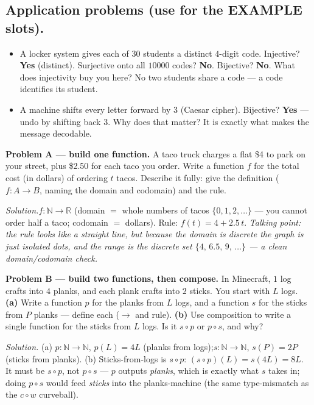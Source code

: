 \documentclass[12pt]{article}
\begin{document}
\subsection*{Application problems (use for the EXAMPLE slots).}
\begin{itemize}
  \item A locker system gives each of $30$ students a distinct $4$-digit code. Injective? \textbf{Yes} (distinct). Surjective onto all $10000$ codes? \textbf{No}. Bijective? \textbf{No}. What does injectivity buy you here? No two students share a code --- a code identifies its student.
  \item A machine shifts every letter forward by $3$ (Caesar cipher). Bijective? \textbf{Yes} --- undo by shifting back $3$. Why does that matter? It is exactly what makes the message decodable.
\end{itemize}

\textbf{Problem A --- build one function.}\quad
A taco truck charges a flat \$4 to park on your street, plus \$2.50 for each taco you order. Write a function $f$ for the total cost (in dollars) of ordering $t$ tacos. Describe it fully: give the definition ($f\colon A \to B$, naming the domain and codomain) and the rule.

\textit{Solution.}\quad $f\colon \mathbb{N} \to \mathbb{R}$ (domain $=$ whole numbers of tacos $\{0,1,2,\ldots\}$ --- you cannot order half a taco; codomain $=$ dollars). Rule: $f(t) = 4 + 2.5\,t$. \textit{Talking point: the rule looks like a straight line, but because the domain is discrete the graph is just isolated dots, and the range is the discrete set $\{4,\,6.5,\,9,\,\ldots\}$ --- a clean domain/codomain check.}

\medskip
\textbf{Problem B --- build two functions, then compose.}\quad
In Minecraft, $1$ log crafts into $4$ planks, and each plank crafts into $2$ sticks. You start with $L$ logs.
\textbf{(a)} Write a function $p$ for the planks from $L$ logs, and a function $s$ for the sticks from $P$ planks --- define each ($\to$ and rule).
\textbf{(b)} Use composition to write a single function for the sticks from $L$ logs. Is it $s \circ p$ or $p \circ s$, and why?

\textit{Solution.}\quad
(a) $p\colon \mathbb{N} \to \mathbb{N}$, $p(L) = 4L$ (planks from logs);\quad $s\colon \mathbb{N} \to \mathbb{N}$, $s(P) = 2P$ (sticks from planks).
(b) Sticks-from-logs is $s \circ p$: $(s \circ p)(L) = s(4L) = 8L$. It must be $s \circ p$, not $p \circ s$ --- $p$ outputs \emph{planks}, which is exactly what $s$ takes in; doing $p \circ s$ would feed \emph{sticks} into the planks-machine (the same type-mismatch as the $c \circ w$ curveball).
\end{document}

